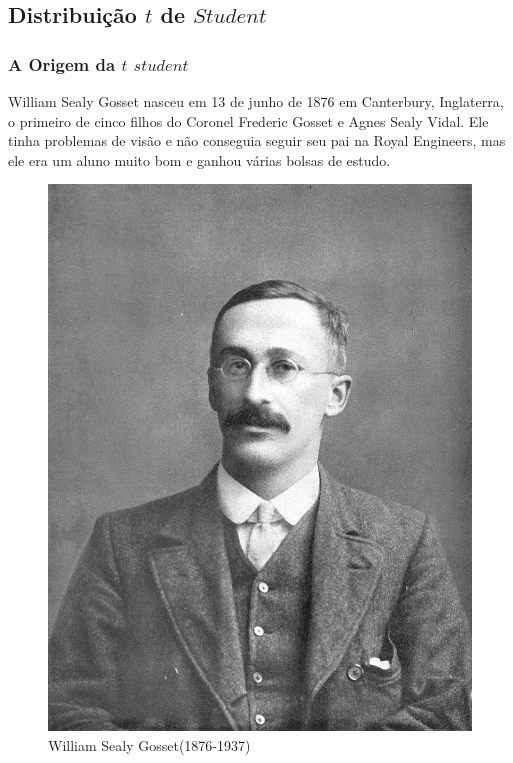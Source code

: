 \newpage
\subsection{Distribuição $t$ de $Student$}
\subsubsection{A Origem da $t$ $student$}

William Sealy Gosset nasceu em 13 de junho de 1876 em Canterbury, Inglaterra, o primeiro de cinco filhos do Coronel Frederic Gosset e Agnes Sealy Vidal. Ele tinha problemas de visão e não conseguia seguir seu pai na Royal Engineers, mas ele era um aluno muito bom e ganhou várias bolsas de estudo.

\begin{figure}
    \centering
\includegraphics[scale=0.15]{figures/William_Sealy_Gosset.jpeg}
    \caption{William Sealy Gosset(1876-1937)}
    \label{fig:my_label3}
\end{figure}



